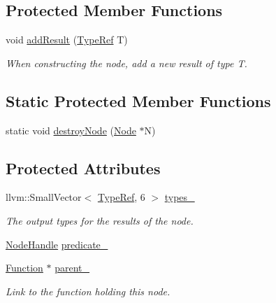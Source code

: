 \subsection*{Protected Member Functions}
\begin{DoxyCompactItemize}
\item 
\mbox{\label{classglow_1_1_node_ae650ba4d94f1a206e5a495de6ac2d512}} 
void \hyperlink{classglow_1_1_node_ae650ba4d94f1a206e5a495de6ac2d512}{add\+Result} (\hyperlink{structglow_1_1_type}{Type\+Ref} T)
\begin{DoxyCompactList}\small\item\em When constructing the node, add a new result of type {\ttfamily T}. \end{DoxyCompactList}\end{DoxyCompactItemize}
\subsection*{Static Protected Member Functions}
\begin{DoxyCompactItemize}
\item 
static void \hyperlink{classglow_1_1_node_aca9c9027bff8aa59822a0e79d1c1914d}{destroy\+Node} (\hyperlink{classglow_1_1_node}{Node} $\ast$N)
\end{DoxyCompactItemize}
\subsection*{Protected Attributes}
\begin{DoxyCompactItemize}
\item 
\mbox{\label{classglow_1_1_node_afd0dabbd2c342c80c33f16d2ed30102a}} 
llvm\+::\+Small\+Vector$<$ \hyperlink{structglow_1_1_type}{Type\+Ref}, 6 $>$ \hyperlink{classglow_1_1_node_afd0dabbd2c342c80c33f16d2ed30102a}{types\+\_\+}
\begin{DoxyCompactList}\small\item\em The output types for the results of the node. \end{DoxyCompactList}\item 
\hyperlink{structglow_1_1_node_handle}{Node\+Handle} \hyperlink{classglow_1_1_node_abff87321fccd69d8c1feb8b453c28e13}{predicate\+\_\+}
\item 
\mbox{\label{classglow_1_1_node_aba7da8db8229694ff1a01c4364d9f68d}} 
\hyperlink{classglow_1_1_function}{Function} $\ast$ \hyperlink{classglow_1_1_node_aba7da8db8229694ff1a01c4364d9f68d}{parent\+\_\+}
\begin{DoxyCompactList}\small\item\em Link to the function holding this node. \end{DoxyCompactList}\end{DoxyCompactItemize}
